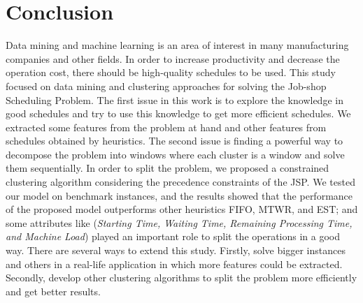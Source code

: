 \documentclass[runningheads]{llncs}
\begin{document}
\section{Conclusion}
Data mining and machine learning is an area of interest in many manufacturing companies and other fields. In order to increase productivity and decrease the operation cost, there should be high-quality schedules to be used. This study focused on data mining and clustering approaches for solving the Job-shop Scheduling Problem. The first issue in this work is to explore the knowledge in good schedules and try to use this knowledge to get more efficient schedules. We extracted some features from the problem at hand and other features from schedules obtained by heuristics. The second issue is finding a powerful way to decompose the problem into windows where each cluster is a window and solve them sequentially. In order to split the problem, we proposed a constrained clustering algorithm considering the precedence constraints of the JSP. We tested our model on benchmark instances, and the results showed that the performance of the proposed model outperforms other heuristics FIFO, MTWR, and EST; and some attributes like (\textit{Starting Time, Waiting Time, Remaining Processing Time, and Machine Load}) played an important role to split the operations in a good way. There are several ways to extend this study. Firstly, solve bigger instances and others in a real-life application in which more features could be extracted. Secondly, develop other clustering algorithms to split the problem more efficiently and get better results.



\end{document}
